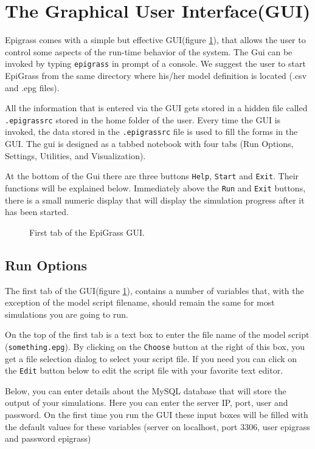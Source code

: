 \section{The Graphical User Interface(GUI)}
Epigrass comes with a simple but effective GUI(figure \ref{fig:gui}), that allows the user to control some aspects of the run-time behavior of the system. The Gui can be invoked by typing \texttt{epigrass} in prompt of a console. We suggest the user to start EpiGrass from the same directory where his/her model definition is located (.csv and .epg files).

All the information that is entered via the GUI gets  stored in a hidden file called \texttt{.epigrassrc} stored in the home folder of the user. Every time the GUI is invoked, the data stored in the \texttt{.epigrassrc} file is used to fill the forms in the GUI. The gui is designed as a tabbed notebook with four tabs (Run Options, Settings, Utilities, and Visualization).

At the bottom of the Gui there are three buttons \texttt{Help}, \texttt{Start} and \texttt{Exit}. Their functions will be explained below. Immediately above the \texttt{Run} and \texttt{Exit} buttons, there is a small numeric display that will display the simulation progress after it has been started.
\begin{figure}
	\centering
	\caption{First tab of the EpiGrass GUI.}
	\label{fig:gui}
\end{figure}

\subsection{Run Options}
The first tab of the GUI(figure \ref{fig:gui}), contains a number of variables that, with the exception of the model script filename, should remain the same for most simulations you are going to run.

On the top of the first tab is a text box to enter the file name of the model script (\texttt{something.epg}). By clicking on the \texttt{Choose} button at the right of this box, you get a file selection dialog to select your script file. If you need you can click on the \texttt{Edit} button below to edit the script file with your favorite text editor.

Below, you can enter details about the MySQL database that will store the output of your simulations. Here you can enter the server IP, port, user and password. On the first time you run the GUI these input boxes will be filled with the default values for these variables (server on localhost, port 3306, user epigrass and password epigrass)

